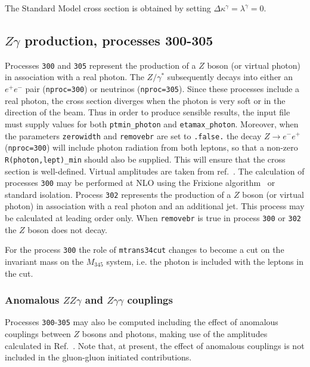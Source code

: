 \documentclass[12pt]{article}
\begin{document}
The Standard Model cross section is obtained by setting $\Delta\kappa^\gamma = \lambda^\gamma = 0$.

\subsection{$Z\gamma$ production, processes 300-305}
\label{subsec:zgamma}

Processes {\tt 300} and {\tt 305} represent the production of a $Z$ boson (or virtual photon)
in association with a real photon. The $Z/\gamma^*$ subsequently decays into 
either an $e^+ e^-$ pair ({\tt nproc=300}) or neutrinos ({\tt nproc=305}).
Since these processes include a real photon, the cross section diverges
when the photon is very soft or in the direction of the beam.
Thus in order to produce sensible results, the input file must supply values for both
{\tt ptmin\_photon} and {\tt etamax\_photon}. Moreover, when the parameters {\tt zerowidth}
and {\tt removebr} are set to {\tt .false.} the decay $Z \to e^- e^+$ ({\tt nproc=300})
will include photon radiation from both leptons, so that a non-zero {\tt R(photon,lept)\_min}
should also be supplied. This will ensure that the cross section is well-defined.
Virtual amplitudes are taken from ref.~\cite{Dixon:1998py}.
The calculation of processes {\tt 300} may be performed
at NLO using the Frixione algorithm~\cite{Frixione:1998jh} or standard isolation. 
Process {\tt 302} represents the production of a $Z$ boson (or virtual photon)
in association with a real photon and an additional jet. This process may be
calculated at leading order only. 
When {\tt removebr} is true in process {\tt 300} or {\tt 302} the $Z$ boson does not decay.

For the process {\tt 300}  the role of {\tt mtrans34cut} changes to become a cut 
on the invariant mass on the $M_{345}$ system, i.e. the photon is included with the leptons in the cut. 

\subsubsection{Anomalous $ZZ\gamma$ and $Z\gamma\gamma$ couplings}
Processes {\tt 300}-{\tt 305} may also be computed including the effect of anomalous couplings between $Z$ bosons
and photons, making use of the amplitudes calculated in Ref.~\cite{DeFlorian:2000sg}.
Note that, at present, the effect of anomalous couplings is not included in the gluon-gluon
initiated contributions.
\end{document}

